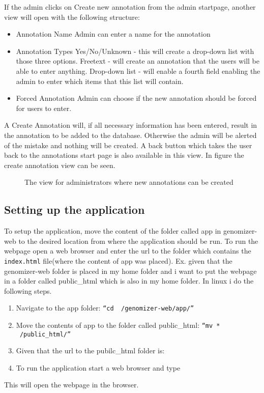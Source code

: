 If the admin clicks on Create new annotation from the admin startpage, another view will open with the following structure:
\begin{itemize}
 \item Annotation Name
 \subitem Admin can enter a name for the annotation
 
 \item Annotation Types
 \subitem Yes/No/Unknown - this will create a drop-down list with those three options.
 \subitem Freetext - will create an annotation that the users will be able to enter anything.
 \subitem Drop-down list - will enable a fourth field enabling the admin to enter which items that this list will contain.
 
 \item Forced Annotation
 \subitem Admin can choose if the new annotation should be forced for users to enter. 
\end{itemize}

A Create Annotation will, if all necessary information has been entered, result in the annotation to be added to the database. Otherwise the admin will be alerted of the mistake and nothing will be created.
\newpage
A back button which takes the user back to the annotations start page is also available in this view. In figure  the create annotation view can be seen.

\begin{figure}[t]
 \caption{The view for administrators where new annotations can be created}
 \label{adm_web_createView}
\end{figure}

\subsection{Setting up the application}
To setup the application, move the content of the folder called app in genomizer-web to the desired location from where the application should be run. To run the webpage open a web browser and enter the url to the folder which contains the \texttt{index.html} file(where the content of app was placed).
Ex. given that the genomizer-web folder is placed in my home folder and i want to put the webpage in a folder called public\_html which is also in my home folder. In linux i do the following steps.
\begin{enumerate}
	\item Navigate to the app folder: \texttt{“cd ~/genomizer-web/app/”}
	\item Move the contents of app to the folder called public\_html: \texttt{“mv * ~/public\_html/”}
	\item Given that the url to the pubilc\_html folder is: 
	\item To run the application start a web browser and type 
\end{enumerate}
This will open the webpage in the browser.
